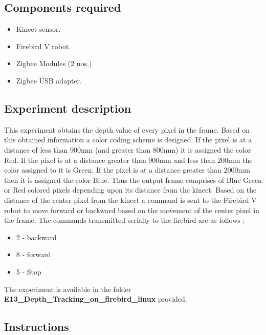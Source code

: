 \begin{flushleft}
\subsection{\textbf{ Components required}}
\begin{itemize}
 \item Kinect sensor.
 \item Firebird V robot.
\item Zigbee Modules (2 nos.)
\item Zigbee USB adapter.
 \end{itemize}
\medskip

\subsection{\textbf{ Experiment description}}
This experiment obtains the depth value of every pixel in the frame. Based on this obtained information a color coding scheme is designed. If the pixel is at a distance of less than 900mm (and greater than 800mm) it is assigned the color Red. If the pixel is at a distance greater than 900mm and less than 200mm the color assigned to it is Green. If the pixel is at a distance greater than 2000mm then it is assigned the color Blue. Thus the output frame comprises of Blue Green or Red colored pixels depending upon its distance from the kinect. Based on the distance of the center pixel from the kinect a command is sent to the Firebird V robot to move forward or backward based on the movement of the center pixel in the frame.
 The commands transmitted serially to the firebird are as follows :
 \begin{itemize}
 \item 2 - backward
 \item 8 - forward
 \item 5 - Stop
 \end{itemize}

\medskip
The experiment is available in the folder \textbf{E13\_Depth\_Tracking\_on\_firebird\_linux} provided.
\medskip

\subsection{\textbf{ Instructions}}
\begin{enumerate}


\end{enumerate}
\end{flushleft}
